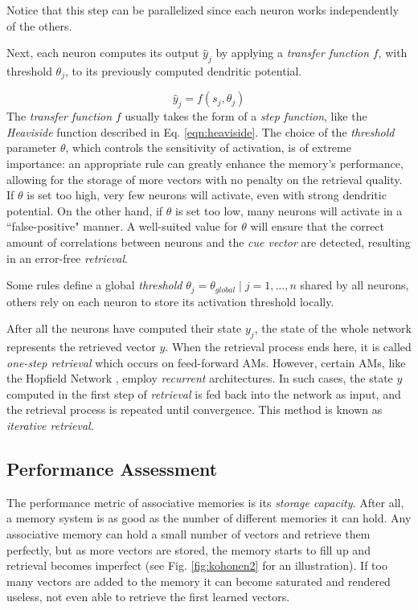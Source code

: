 \documentclass[runningheads]{llncs}
\begin{document}
Notice that this step can be parallelized since each neuron works independently of the others.

Next, each neuron computes its output $\hat{y}_j$ by applying a \textit{transfer function} $f$, with threshold $\theta_j$, to its previously computed dendritic potential.

\begin{equation}
\label{eqn:transfer_func}
    \hat{y}_{j}=f\left(s_{j},\theta_j\right)
\end{equation}
The \textit{transfer function} $f$ usually takes the form of a \textit{step function}, like the \textit{Heaviside} function described in Eq. \ref{eqn:heaviside}. The choice of the \textit{threshold} parameter $\theta$, which controls the sensitivity of activation, is of extreme importance: an appropriate rule can greatly enhance the memory's performance, allowing for the storage of more vectors with no penalty on the retrieval quality. If $\theta$ is set too high, very few neurons will activate, even with strong dendritic potential. On the other hand, if $\theta$ is set too low, many neurons will activate in a ``false-positive" manner. A well-suited value for $\theta$ will ensure that the correct amount of correlations between neurons and the \textit{cue vector} are detected, resulting in an error-free \textit{retrieval}.

Some rules define a global \textit{threshold} $\theta_j = \theta_{global} \mid j=1, \ldots, n $ shared by all neurons, others rely on each neuron to store its activation threshold locally.

After all the neurons have computed their state $y_j$, the state of the whole network represents the retrieved vector $y$. When the retrieval process ends here, it is called \textit{one-step retrieval} which occurs on feed-forward AMs. However, certain AMs, like the Hopfield Network \cite{hopfield1982neural}, employ \textit{recurrent} architectures. In such cases, the state $y$ computed in the first step of \textit{retrieval} is fed back into the network as input, and the retrieval process is repeated until convergence. This method is known as \textit{iterative retrieval}.

\subsection{Performance Assessment}
\label{sec:assomem_perf}
The performance metric of associative memories is its \textit{storage capacity}. After all, a memory system is as good as the number of different memories it can hold. Any associative memory can hold a small number of vectors and retrieve them perfectly, but as more vectors are stored, the memory starts to fill up and retrieval becomes imperfect (see Fig. \ref{fig:kohonen2} for an illustration). If too many vectors are added to the memory it can become saturated and rendered useless, not even able to retrieve the first learned vectors.
\end{document}
